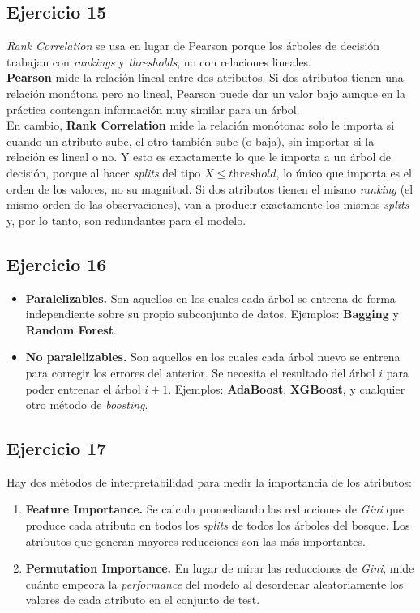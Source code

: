 \documentclass[a4paper,12pt]{article}
\begin{document}
        \subsection*{Ejercicio 15}
            \noindent \textit{Rank Correlation} se usa en lugar de Pearson porque los árboles de decisión trabajan con \textit{rankings} y \textit{thresholds}, no con relaciones lineales. \\

            \noindent \textbf{Pearson} mide la relación lineal entre dos atributos. Si dos atributos tienen una relación monótona pero no lineal, Pearson puede dar un valor bajo aunque en la práctica contengan información muy similar para un árbol. \\

            \noindent En cambio, \textbf{Rank Correlation} mide la relación monótona: solo le importa si cuando un atributo sube, el otro también sube (o baja), sin importar si la relación es lineal o no. Y esto es exactamente lo que le importa a un árbol de decisión, porque al hacer \textit{splits} del tipo $X \leq \textit{threshold}$, lo único que importa es el orden de los valores, no su magnitud. Si dos atributos tienen el mismo \textit{ranking} (el mismo orden de las observaciones), van a producir exactamente los mismos \textit{splits} y, por lo tanto, son redundantes para el modelo.
        \subsection*{Ejercicio 16}
            \begin{itemize}
                \item \textbf{Paralelizables.} Son aquellos en los cuales cada árbol se entrena de forma independiente sobre su propio subconjunto de datos. Ejemplos: \textbf{Bagging} y \textbf{Random Forest}.
                \item \textbf{No paralelizables.} Son aquellos en los cuales cada árbol nuevo se entrena para corregir los errores del anterior. Se necesita el resultado del árbol $i$ para poder entrenar el árbol $i+1$. Ejemplos: \textbf{AdaBoost}, \textbf{XGBoost}, y cualquier otro método de \textit{boosting}.
            \end{itemize}
        \subsection*{Ejercicio 17}
            \noindent Hay dos métodos de interpretabilidad para medir la importancia de los atributos:
            \begin{enumerate}
                \item \textbf{Feature Importance.} Se calcula promediando las reducciones de \textit{Gini} que produce cada atributo en todos los \textit{splits} de todos los árboles del bosque. Los atributos que generan mayores reducciones son las más importantes.
                \item \textbf{Permutation Importance.} En lugar de mirar las reducciones de \textit{Gini}, mide cuánto empeora la \textit{performance} del modelo al desordenar aleatoriamente los valores de cada atributo en el conjunto de test.
            \end{enumerate}
\end{document}
